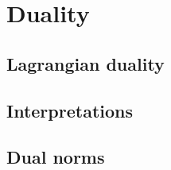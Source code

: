 \chapter{Duality}
\label{chap:duality_general}

\section{Lagrangian duality}
\label{sec:lagrangian_duality}

\section{Interpretations}
\label{sec:duality_interpretations}

\section{Dual norms}
\label{sec:dual_norms}


